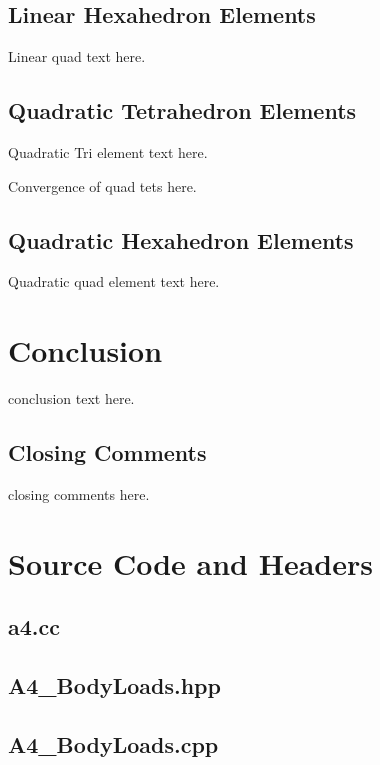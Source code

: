 \documentclass[a4paper, 12pt]{article}
\begin{document}
\subsection{Linear Hexahedron Elements} \label{subsec:linHex}
Linear quad text here.

\subsection{Quadratic Tetrahedron Elements} \label{subsec:quadTet}
Quadratic Tri element text here.

Convergence of quad tets here.

\subsection{Quadratic Hexahedron Elements} \label{subsec:quadHex}
Quadratic quad element text here.

\section{Conclusion} \label{sec:conclusion}
conclusion text here.

\subsection{Closing Comments} \label{sec:comments}
closing comments here.

\newpage
\appendix
\section{Source Code and Headers} \label{sec:code}

\subsection{a4.cc} \label{subsec:a4.cc}


\subsection{A4\_BodyLoads.hpp} \label{subsec:BLhpp}


\subsection{A4\_BodyLoads.cpp} \label{subsec:BLcpp}

\end{document}
